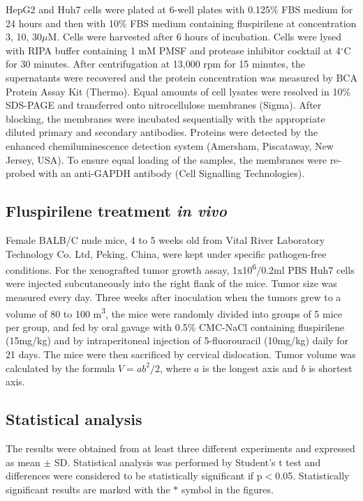 \documentclass[10pt,letterpaper]{article}
\begin{document}
HepG2 and Huh7 cells were plated at 6-well plates with 0.125\% FBS medium for 24 hours and then with 10\% FBS medium containing fluspirilene at concentration 3, 10, 30$\mu$M. Cells were harvested after 6 hours of incubation. Cells were lysed with RIPA buffer containing 1 mM PMSF and protease inhibitor cocktail at 4$^\circ$C for 30 minutes. After centrifugation at 13,000 rpm for 15 minutes, the supernatants were recovered and the protein concentration was measured by BCA Protein Assay Kit (Thermo). Equal amounts of cell lysates were resolved in 10\% SDS-PAGE and transferred onto nitrocellulose membranes (Sigma). After blocking, the membranes were incubated sequentially with the appropriate diluted primary and secondary antibodies. Proteins were detected by the enhanced chemiluminescence detection system (Amersham, Piscataway, New Jersey, USA). To ensure equal loading of the samples, the membranes were re-probed with an anti-GAPDH antibody (Cell Signalling Technologies).

\subsection*{Fluspirilene treatment \textit{in vivo}}

Female BALB/C nude mice, 4 to 5 weeks old from Vital River Laboratory Technology Co. Ltd, Peking, China, were kept under specific pathogen-free conditions. For the xenografted tumor growth assay, 1x10\textsuperscript{6}/0.2ml PBS Huh7 cells were injected subcutaneously into the right flank of the mice. Tumor size was measured every day. Three weeks after inoculation when the tumors grew to a volume of 80 to 100 m\textsuperscript{3}, the mice were randomly divided into groups of 5 mice per group, and fed by oral gavage with 0.5\% CMC-NaCl containing fluspirilene (15mg/kg) and by intraperitoneal injection of 5-fluorouracil (10mg/kg) daily for 21 days. The mice were then sacrificed by cervical dislocation. Tumor volume was calculated by the formula $V=ab^2/2$, where $a$ is the longest axis and $b$ is shortest axis.

\subsection*{Statistical analysis}

The results were obtained from at least three different experiments and expressed as mean $\pm$ SD. Statistical analysis was performed by Student's t test and differences were considered to be statistically significant if p$<$0.05. Statistically significant results are marked with the $\ast$ symbol in the figures.
\end{document}
